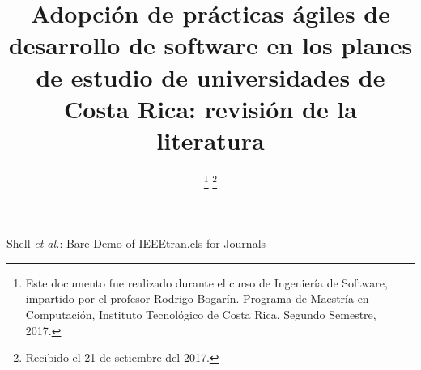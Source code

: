 \documentclass[journal]{IEEEtran}
\begin{document}
%
\title{Adopción de prácticas ágiles de desarrollo de software en los planes de estudio de universidades de Costa Rica: revisión de la literatura}




\author{%
\thanks{Este documento fue realizado durante el curso de Ingeniería de Software, impartido por el profesor Rodrigo Bogarín. Programa de Maestría en Computación, Instituto Tecnológico de Costa Rica. Segundo Semestre, 2017.}
\thanks{Recibido el 21 de setiembre del 2017.}}



%
{Shell \MakeLowercase{\textit{et al.}}: Bare Demo of IEEEtran.cls for Journals}
% 







\end{document}
